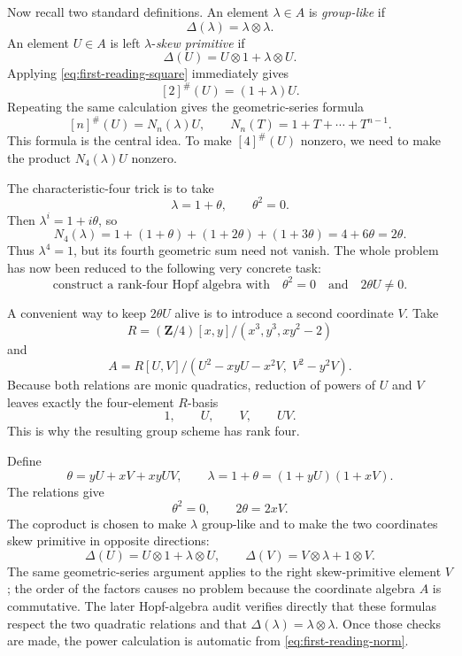 \documentclass[11pt]{article}
\theoremstyle{remark}
\newcommand{\Z}{\mathbf Z}
\newcommand{\ot}{\otimes}
\begin{document}
Now recall two standard definitions.  An element $\lambda\in A$ is
\emph{group-like} if
\[
 \Delta(\lambda)=\lambda\ot\lambda.
\]
An element $U\in A$ is left $\lambda$-\emph{skew primitive} if
\[
 \Delta(U)=U\ot1+\lambda\ot U.
\]
Applying \eqref{eq:first-reading-square} immediately gives
\[
 [2]^\#(U)=(1+\lambda)U.
\]
Repeating the same calculation gives the geometric-series formula
\begin{equation}\label{eq:first-reading-norm}
 [n]^\#(U)=N_n(\lambda)U,
 \qquad
 N_n(T)=1+T+\cdots+T^{n-1}.
\end{equation}
This formula is the central idea.  To make $[4]^\#(U)$ nonzero, we need to
make the product $N_4(\lambda)U$ nonzero.

The characteristic-four trick is to take
\[
 \lambda=1+\theta,
 \qquad \theta^2=0.
\]
Then $\lambda^i=1+i\theta$, so
\begin{equation}\label{eq:first-reading-carry}
 N_4(\lambda)
 =1+(1+\theta)+(1+2\theta)+(1+3\theta)
 =4+6\theta=2\theta.
\end{equation}
Thus $\lambda^4=1$, but its fourth geometric sum need not vanish.  The whole
problem has now been reduced to the following very concrete task:
\begin{equation}\label{eq:first-reading-task}
 \text{construct a rank-four Hopf algebra with}
 \quad \theta^2=0
 \quad\text{and}\quad 2\theta U\ne0.
\end{equation}

A convenient way to keep $2\theta U$ alive is to introduce a second
coordinate $V$.  Take
\[
 R=(\Z/4)[x,y]/(x^3,y^3,xy^2-2)
\]
and
\[
 A=R[U,V]/(U^2-xyU-x^2V,\;V^2-y^2V).
\]
Because both relations are monic quadratics, reduction of powers of $U$ and
$V$ leaves exactly the four-element $R$-basis
\begin{equation}\label{eq:first-reading-basis}
 1,\qquad U,\qquad V,\qquad UV.
\end{equation}
This is why the resulting group scheme has rank four.

Define
\begin{equation}\label{eq:first-reading-lambda}
 \theta=yU+xV+xyUV,
 \qquad
 \lambda=1+\theta=(1+yU)(1+xV).
\end{equation}
The relations give
\begin{equation}\label{eq:first-reading-identities}
 \theta^2=0,
 \qquad
 2\theta=2xV.
\end{equation}
The coproduct is chosen to make $\lambda$ group-like and to make the two
coordinates skew primitive in opposite directions:
\begin{equation}\label{eq:first-reading-coproduct}
 \Delta(U)=U\ot1+\lambda\ot U,
 \qquad
 \Delta(V)=V\ot\lambda+1\ot V.
\end{equation}
The same geometric-series argument applies to the right skew-primitive
element $V$; the order of the factors causes no problem because the
coordinate algebra $A$ is commutative.
The later Hopf-algebra audit verifies directly that these formulas respect
the two quadratic relations and that
$\Delta(\lambda)=\lambda\ot\lambda$.  Once those checks are made, the power
calculation is automatic from \eqref{eq:first-reading-norm}.
\end{document}

